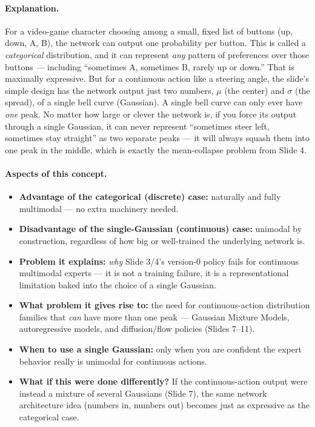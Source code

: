 \documentclass[11pt]{article}
\begin{document}
\paragraph{Explanation.}
For a video-game character choosing among a small, fixed list of buttons (up, down, A,
B), the network can output one probability per button. This is called a
\emph{categorical} distribution, and it can represent \emph{any} pattern of preferences
over those buttons --- including ``sometimes A, sometimes B, rarely up or down.'' That
is maximally expressive. But for a continuous action like a steering angle, the slide's
simple design has the network output just two numbers, $\mu$ (the center) and $\sigma$
(the spread), of a single bell curve (Gaussian). A single bell curve can only ever have
\emph{one} peak. No matter how large or clever the network is, if you force its output
through a single Gaussian, it can never represent ``sometimes steer left, sometimes stay
straight'' as two separate peaks --- it will always squash them into one peak in the
middle, which is exactly the mean-collapse problem from Slide 4.

\paragraph{Aspects of this concept.}
\begin{itemize}
\item \textbf{Advantage of the categorical (discrete) case:} naturally and fully
multimodal --- no extra machinery needed.
\item \textbf{Disadvantage of the single-Gaussian (continuous) case:} unimodal by
construction, regardless of how big or well-trained the underlying network is.
\item \textbf{Problem it explains:} \emph{why} Slide 3/4's version-0 policy fails for
continuous multimodal experts --- it is not a training failure, it is a
representational limitation baked into the choice of a single Gaussian.
\item \textbf{What problem it gives rise to:} the need for continuous-action
distribution families that \emph{can} have more than one peak --- Gaussian Mixture
Models, autoregressive models, and diffusion/flow policies (Slides 7--11).
\item \textbf{When to use a single Gaussian:} only when you are confident the expert
behavior really is unimodal for continuous actions.
\item \textbf{What if this were done differently?} If the continuous-action output were
instead a mixture of several Gaussians (Slide 7), the same network architecture idea
(numbers in, numbers out) becomes just as expressive as the categorical case.
\end{itemize}
\end{document}
